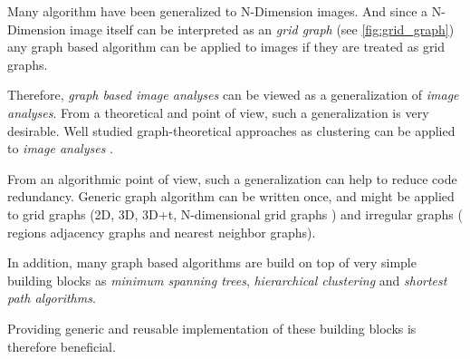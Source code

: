 
Many algorithm have been generalized to N-Dimension images.
And since a N-Dimension image itself can be interpreted as an \emph{grid graph}  (see \cref{fig:grid_graph}) any graph based algorithm can be applied to images if they are treated as grid graphs.

Therefore, \emph{graph based image analyses} can be viewed as a generalization of \emph{image analyses}.
From a theoretical and  point of view, such a generalization is very desirable.
Well studied graph-theoretical approaches as clustering can be applied 
to  \emph{image analyses} \cite{vlachos_1993_csv,arbelaez_2006_cvpr,ohlander_1978_cgip}.

From an algorithmic point of view, such a generalization can help to reduce 
code redundancy.
Generic graph algorithm can be written once, and might be applied 
to grid graphs (2D, 3D, 3D+t, N-dimensional grid graphs ) and irregular graphs ( \eg regions adjacency graphs and nearest neighbor graphs).

In addition, many graph based algorithms are build on top of
very simple building blocks 
as \emph{minimum spanning trees}, \emph{hierarchical clustering} and 
\emph{shortest path algorithms}. 

Providing generic and reusable implementation of these building blocks
 is therefore beneficial.







